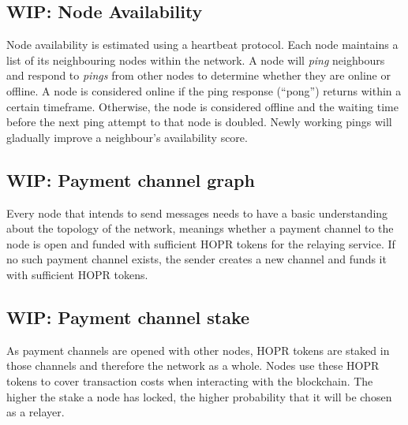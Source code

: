 \subsection{WIP: Node Availability}
\label{sec:nodeavailability}

Node availability is estimated using a heartbeat protocol. Each node maintains a
list of its neighbouring nodes within the network. A node will \textit{ping} neighbours and
respond to \textit{pings} from other nodes to determine whether they are online or offline.
A node is considered online if the ping response (``pong”) returns within a
certain timeframe. Otherwise, the node is considered offline and the waiting
time before the next ping attempt to that node is doubled. Newly working pings will gladually improve a
neighbour's availability score.

\subsection{WIP: Payment channel graph}

Every node that intends to send messages needs to have a basic understanding
about the topology of the network, meanings whether a payment channel to the node is open and
funded with sufficient HOPR tokens for the relaying service. If no such
payment channel exists, the sender creates a new channel and funds it with
sufficient HOPR tokens.

\subsection{WIP: Payment channel stake}

As payment channels are opened with other nodes, HOPR tokens are staked in those channels and therefore the network as a whole. Nodes use these HOPR
tokens to cover transaction costs when interacting with the blockchain. The higher
the stake a node has locked, the higher probability that it will be chosen as a relayer.

